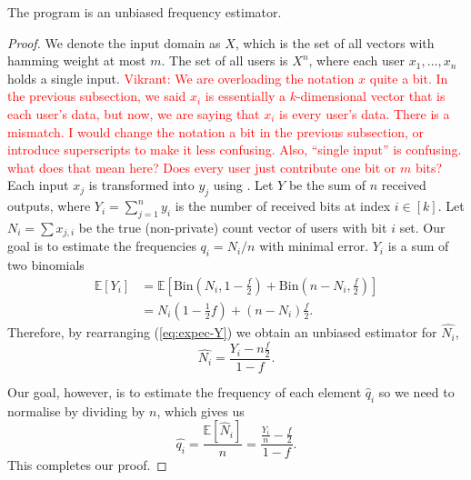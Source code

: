 \documentclass{article}
\begin{document}
\begin{theorem}
\label{thm:unbiased-estimator}
	The program  is an unbiased frequency estimator.
\end{theorem}
\begin{proof} We denote the input domain as $X$, which is the set of all vectors with hamming weight at most $m$. The set of all users is $X^n$, where each user $x_1,\ldots,x_n$ holds a single input. \textcolor{red}{Vikrant: We are overloading the notation $x$ quite a bit. In the previous subsection, we said $x_i$ is essentially a $k$-dimensional vector that is each user's data, but now, we are saying that $x_i$ is every user's data. There is a mismatch. I would change the notation a bit in the previous subsection, or introduce superscripts to make it less confusing. Also, ``single input'' is confusing. what does that mean here? Does every user just contribute one bit or $m$ bits?} Each input $x_j$ is transformed into $y_j$ using . Let $Y$ be the sum of $n$ received outputs, where $Y_i=\sum_{j=1}^n y_i$ is the number of received bits at index $i\in [k]$. Let $N_i=\sum x_{j,i}$ be the true (non-private) count vector of users with bit $i$ set. Our goal is to estimate the frequencies $q_i=N_i/n$ with minimal error. $Y_i$ is a sum of two binomials
\begin{align}
\mathbb{E}[Y_i] &= \mathbb{E}\left[\text{Bin}\left(N_i,1-\frac{f}{2}\right)+\text{Bin}\left(n-N_i,\frac{f}{2}\right)\right]\label{eq:YsumBin}\\
    &=N_i\left(1-\frac{1}{2}f\right) + (n-N_i)\frac{f}{2}\label{eq:expec-Y}.
\end{align}
Therefore, by rearranging (\ref{eq:expec-Y}) we obtain an unbiased estimator for $\hat{N_i}$,
\begin{equation}
    \label{eq:estimator}
    \hat{N_i} = \frac{Y_i-n\frac{f}{2}}{1-f}.
\end{equation}

Our goal, however, is to estimate the frequency of each element $\hat{q}_i$ so we need to normalise by dividing by $n$, which gives us
\[
\hat{q_i}=\frac{\mathbb{E}[\hat{N}_i]}{n} = \frac{\frac{Y_i}{n}-\frac{f}{2}}{1-f}.
\]
This completes our proof.
\end{proof}
\end{document}
